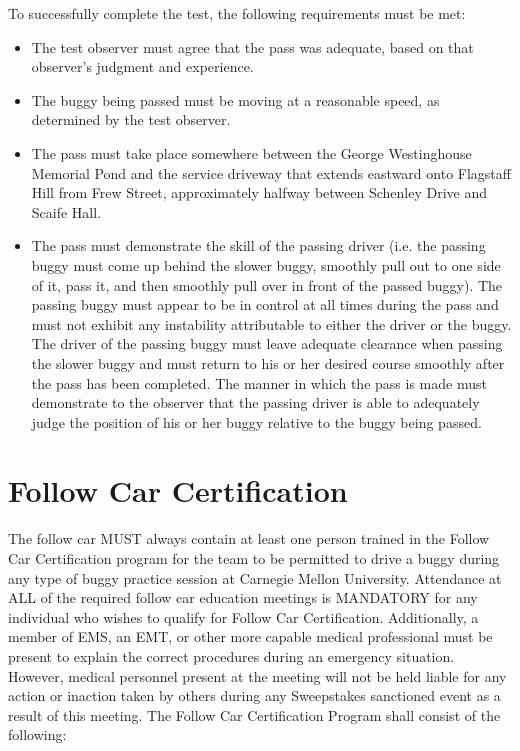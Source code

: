 	\noindent To successfully complete the test, the following requirements must be met:

	\begin{itemize}

		\item The test observer must agree that the pass was adequate, based on
		that observer's judgment and experience.

		\item The buggy being passed must be moving at a reasonable speed, as
		determined by the test observer.

		\item The pass must take place somewhere between the George Westinghouse
		Memorial Pond and the service driveway that extends eastward onto Flagstaff
		Hill from Frew Street, approximately halfway between Schenley Drive and Scaife
		Hall.

		\item The pass must demonstrate the skill of the passing driver (i.e. the
		passing buggy must come up behind the slower buggy, smoothly pull out to one
		side of it, pass it, and then smoothly pull over in front of the passed buggy).
		The passing buggy must appear to be in control at all times during the pass and
		must not exhibit any instability attributable to either the driver or the
		buggy. The driver of the passing buggy must leave adequate clearance when
		passing the slower buggy and must return to his or her desired course smoothly
		after the pass has been completed. The manner in which the pass is made must
		demonstrate to the observer that the passing driver is able to adequately judge
		the position of his or her buggy relative to the buggy being passed.

	\end{itemize}

\section{Follow Car Certification}
	The follow car MUST always contain at least one person trained in the Follow 
	Car Certification program for the team to be permitted to drive a buggy during 
	any type of buggy practice session at Carnegie Mellon University. Attendance at 
	ALL of the required follow car education meetings is MANDATORY for any 
	individual who wishes to qualify for Follow Car Certification. Additionally, a 
	member of EMS, an EMT, or other more capable medical professional must be present 
	to explain the correct procedures during an emergency situation. However, medical
	personnel present at the meeting will not be held liable for any action or inaction 
	taken by others during any Sweepstakes sanctioned event as a result of this meeting. 
	The Follow Car Certification Program shall consist of the following:
	
